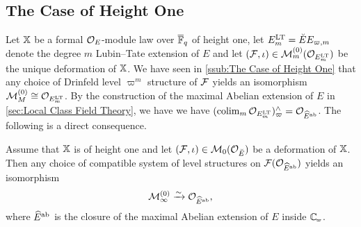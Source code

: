 \documentclass[../main.tex]{subfiles}
\begin{document}

\subsection{The Case of Height One} %
\label{sub:The Case of Height One}
Let $\mathbb{X}$ be a formal $\mathcal{O}_E$-module law over ${\overline {\mathbb{F}}_q}$ of height one, 
let $E^{\mathrm{LT}}_m = {\breve {E}} E_{\varpi, m}$ denote the degree $m$ Lubin--Tate extension of $E$
and let $(\mathcal{F}, \iota) \in \mathcal{M}_{m}^{(0)}(\mathcal{O}_{E^{\mathrm{LT}}_m})$ be the unique deformation
of $\mathbb{X}$.
We have seen in \cref{ssub:The Case of Height One} that any choice of Drinfeld
level $\varpi^m$ structure of $\mathcal{F}$ yields an isomorphism 
$\mathcal{M}_M^{(0)} \cong \mathcal{O}_{E^{\mathrm{LT}}_m}$. By the construction of the maximal Abelian extension
of $E$ in \cref{sec:Local Class Field Theory}, we have we have 
$(\operatorname*{colim}_{m} \mathcal{O}_{E^{\mathrm{LT}}_m})^{\wedge}_\varpi = \mathcal{O}_{\widehat E^{\mathrm{ab}}}$. The following
is a direct consequence.

\begin{prop}\label{prop:InfiniteLevelOfHeightOneIsRepbleByAbExt}
  Assume that $\mathbb{X}$ is of height one and let $(\mathcal{F}, \iota) \in \mathcal{M}_0(\mathcal{O}_{\breve {E}})$ 
  be a deformation of $\mathbb{X}$. 
  Then any choice of compatible system of level structures on $\mathcal{F}(\mathcal{O}_{\widehat
  E^{\mathrm{ab}}})$ yields an isomorphism 
  \begin{equation*}
    \mathcal{M}_{\infty}^{(0)} \xrightarrow{\sim} \mathcal{O}_{\widehat E^{\mathrm{ab}}},
  \end{equation*}
  where $\widehat E^{\mathrm{ab}}$ is the closure of the maximal Abelian extension of $E$ inside
  $\Cp$.
\end{prop}

\end{document}
